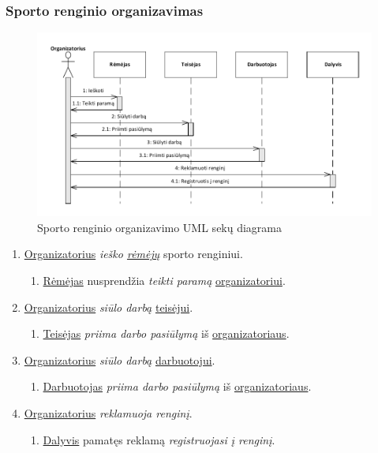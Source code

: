 \documentclass{VUMIFPSkursinis}
\begin{document}
    \subsubsection*{Sporto renginio organizavimas}
      \begin{figure}[H]
        \centering
        \includegraphics[width=\textwidth]{img/SekuDiagrama2}
        \caption{Sporto renginio organizavimo UML sekų diagrama}
        \label{fig:organizavimoSekuDiagrama}
      \end{figure}
      \begin{enumerate}
        \item \underline{Organizatorius} \textit{ieško \underline{rėmėjų}} sporto renginiui.
          \begin{enumerate}
            \item \underline{Rėmėjas} nusprendžia \textit{teikti paramą} \underline{organizatoriui}.
          \end{enumerate}
        \item \underline{Organizatorius} \textit{siūlo darbą} \underline{teisėjui}.
          \begin{enumerate}
            \item \underline{Teisėjas} \textit{priima darbo pasiūlymą} iš \underline{organizatoriaus}.
          \end{enumerate}
        \item \underline{Organizatorius} \textit{siūlo darbą} \underline{darbuotojui}.
          \begin{enumerate}
            \item \underline{Darbuotojas} \textit{priima darbo pasiūlymą} iš \underline{organizatoriaus}.
          \end{enumerate}
        \item \underline{Organizatorius} \textit{reklamuoja renginį}.
          \begin{enumerate}
            \item \underline{Dalyvis} pamatęs reklamą \textit{registruojasi į renginį}.
          \end{enumerate} 
      \end{enumerate}
\end{document}
